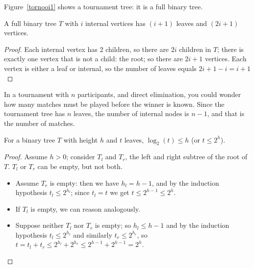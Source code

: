Figure~\ref{tornooi1} shows a tournament tree: it is a full binary tree.

 \begin{theorem}
\label{relatiebladinwendig}
A full binary tree $T$ with $i$ internal vertices has
$(i+1)$ leaves and $(2i+1)$ vertices.
\end{theorem}
\begin{proof} Each internal vertex has 2 children, so there are $2i$
children in $T$; there is exactly one vertex that is not a child: the
root; so there are $2i+1$ vertices. Each vertex is either a leaf or
internal, so the number of leaves equals $2i+1 - i = i+1$
\end{proof}


In a tournament with $n$ participants, and direct elimination, you
could wonder how many matches must be played before the winner is
known. Since the tournament tree has $n$ leaves, the number of
internal nodes is $n-1$, and that is the number of matches.

\begin{theorem}
\label{relatieheightbladeren}
For a binary tree $T$ with height $h$ and $t$ leaves, $\log_2(t) \leq
h$ (or $t \leq 2^h$).
\end{theorem}
\begin{proof}
{
Assume $h > 0$; consider $T_{l}$ and $T_{r}$, the left and right
subtree of the root of $T$. $T_{l}$ or $T_{r}$ can be empty, but not both.
\begin{itemize}
\item
Assume $T_{r}$ is empty: then we have $h_{l} = h-1$, and by the induction hypothesis
$t_{l} \leq 2^{h_{l}}$; since $t_{l} = t$ we get $t \leq 2^{h-1}\leq
2^h$.
\item
If $T_{l}$ is empty, we can reason analogously.
\item
Suppose neither $T_{l}$ nor $T_{r}$ is empty; so $h_{l} \leq h-1$ and
by the induction hypothesis $t_{l} \leq 2^{h_{l}}$ and similarly $t_{r} \leq
2^{h_{r}}$, so $t=t_{l} + t_{r} \leq 2^{h_{l}} + 2^{h_{r}}\leq
2^{h-1}+2^{h-1}=2^h$.
\end{itemize}
}
\end{proof}

